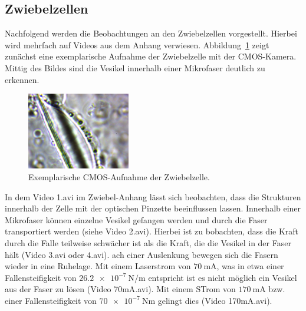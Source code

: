 \subsection{Zwiebelzellen}
Nachfolgend werden die Beobachtungen an den Zwiebelzellen vorgestellt. Hierbei wird mehrfach auf Videos aus dem Anhang
verwiesen. Abbildung~\ref{fig: zwiebelzelle} zeigt zunächst eine exemplarische Aufnahme der Zwiebelzelle mit der CMOS-Kamera.
Mittig des Bildes sind die Vesikel innerhalb einer Mikrofaser deutlich zu erkennen.
\begin{figure}
  \centering
  \includegraphics[width = 0.4\textwidth]{../analysis/data/iii_zwiebel/bilder/1.png}
  \caption{Exemplarische CMOS-Aufnahme der Zwiebelzelle.}
  \label{fig: zwiebelzelle}
\end{figure}

In dem Video 1.avi im Zwiebel-Anhang lässt sich beobachten, dass die Strukturen innerhalb der Zelle mit der optischen Pinzette
beeinflussen lassen. Innerhalb einer Mikrofaser können einzelne Vesikel gefangen werden und durch die Faser transportiert werden
(siehe Video 2.avi). Hierbei ist zu bobachten, dass die Kraft durch die Falle teilweise schwächer ist als die Kraft, die die
Vesikel in der Faser hält (Video 3.avi oder 4.avi). ach einer Auslenkung bewegen sich die Fasern wieder in eine
Ruhelage. Mit einem Laserstrom von $\SI{70}{\milli\ampere}$, was in etwa einer Fallensteifigkeit von
$\SI{26.2e-7}{\newton\per\meter}$ entspricht ist es nicht möglich ein Vesikel aus der Faser zu lösen (Video 70mA.avi). Mit einem STrom
von $\SI{170}{\milli\ampere}$ bzw. einer Fallensteifigkeit von $\SI{70e-7}{\newton\meter}$ gelingt dies (Video 170mA.avi).

